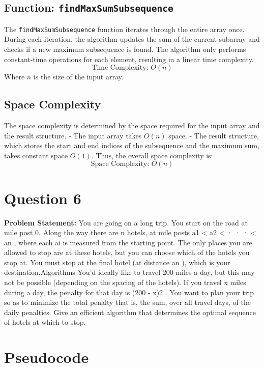 \documentclass[a4paper,12pt]{report}
\begin{document}
\subsection*{Function: \texttt{findMaxSumSubsequence}}
The \texttt{findMaxSumSubsequence} function iterates through the entire array once. During each iteration, the algorithm updates the sum of the current subarray and checks if a new maximum subsequence is found. The algorithm only performs constant-time operations for each element, resulting in a linear time complexity.
\[
\text{Time Complexity: } O(n)
\]
Where \(n\) is the size of the input array.

\subsection*{Space Complexity}
The space complexity is determined by the space required for the input array and the result structure. 
- The input array takes \(O(n)\) space.
- The result structure, which stores the start and end indices of the subsequence and the maximum sum, takes constant space \(O(1)\).
Thus, the overall space complexity is:
\[
\text{Space Complexity: } O(n)
\]

\vspace{50pt}
\section*{Question 6}

\textbf{Problem Statement:} 
You are going on a long trip. You start on the road at mile post 0. Along the way there are n hotels, at mile posts a1 < a2 < · · · < an , where each ai is measured from the starting point. The only places you are allowed to stop are at these hotels, but you can choose which of the hotels you stop at. You must stop at the final hotel (at distance an ), which is your destination.Algorithms You’d ideally like to travel 200 miles a day, but this may not be possible (depending on the spacing
of the hotels). If you travel x miles during a day, the penalty for that day is (200 - x)2 . You want to plan your trip so as to minimize the total penalty that is, the sum, over all travel days, of the
daily penalties. Give an efficient algorithm that determines the optimal sequence of hotels at which to stop.

\section*{Pseudocode}
\end{document}
